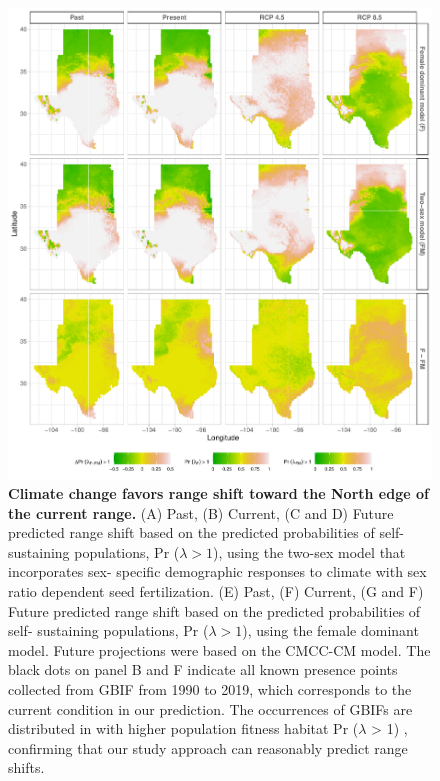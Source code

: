 \documentclass[12pt]{article}
\begin{document}
\begin{figure}[H]
  \begin{center}
    \includegraphics[width=0.99\linewidth]{Figures/Fig_geoPrlambdacmc.pdf}
  \caption{ \textbf{Climate change favors range shift toward the North edge of the current range.}
  (A) Past, (B) Current, (C and D) Future predicted range shift based on the predicted probabilities of self- sustaining populations, Pr ($\lambda > 1$), using the two-sex model that incorporates sex- specific demographic responses to climate with sex ratio dependent seed fertilization.
  (E) Past, (F) Current, (G and F) Future  predicted range shift based on the predicted probabilities of self- sustaining populations, Pr ($\lambda > 1$), using the female dominant model.
  Future projections were based on the CMCC-CM model.
  The black dots on panel B and F indicate all known presence points collected from GBIF from 1990 to 2019, which corresponds to the current condition in our prediction. 
  The occurrences of GBIFs are distributed in with higher population fitness habitat Pr ($\lambda$ > 1) , confirming that our study approach can reasonably predict range shifts. }
  \label{fig:geoprojacc}
  \end{center}
\end{figure}
\end{document}
